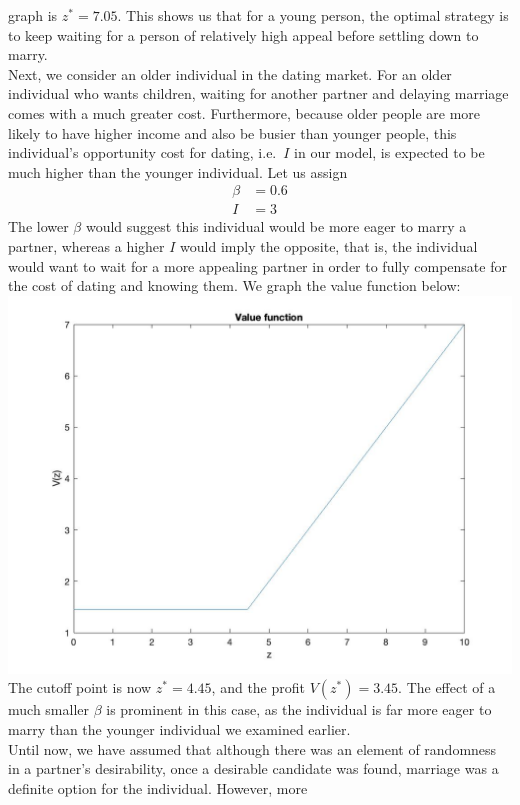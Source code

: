\documentclass[
]{article}
\begin{document}
graph is \(z^* = 7.05\). This shows us that for a young person, the
optimal strategy is to keep waiting for a person of relatively high
appeal before settling down to marry.\\
Next, we consider an older individual in the dating market. For an older
individual who wants children, waiting for another partner and delaying
marriage comes with a much greater cost. Furthermore, because older
people are more likely to have higher income and also be busier than
younger people, this individual's opportunity cost for dating,
i.e.~\(I\) in our model, is expected to be much higher than the younger
individual. Let us assign \[\begin{aligned} \beta&= 0.6\\
I &= 3
\end{aligned}\] The lower \(\beta\) would suggest this individual would
be more eager to marry a partner, whereas a higher \(I\) would imply the
opposite, that is, the individual would want to wait for a more
appealing partner in order to fully compensate for the cost of dating
and knowing them. We graph the value function below:\\
\includegraphics{images/olderdatingvalfunc.jpg} The cutoff point is now
\(z^* = 4.45\), and the profit \(V(z^*) = 3.45\). The effect of a much
smaller \(\beta\) is prominent in this case, as the individual is far
more eager to marry than the younger individual we examined earlier.\\
Until now, we have assumed that although there was an element of
randomness in a partner's desirability, once a desirable candidate was
found, marriage was a definite option for the individual. However, more
\end{document}
